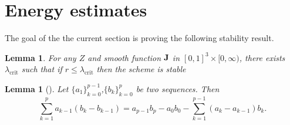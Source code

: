 \documentclass[12pt,reqno]{amsart}
\newcommand{\J}{{\bf J}}
\newtheorem{lem}[theorem]{Lemma}
\newtheorem{lemma}[theorem]{Lemma}
\theoremstyle{definition}
\numberwithin{equation}{section}
\begin{document}
	


	

	\section{Energy estimates}
	The goal of the the current section is proving the following stability result.
	\begin{lemma}\label{lem:coer}
		For any $Z$ and smooth function $\J$ in $[0,1]^3\times [0,\infty)$, there exists 
		$\lambda_{\mathrm{crit}}$ such that if $r\leq \lambda_{\mathrm{crit}}$ then
 the scheme is stable
		\end{lemma}
\begin{lem}[\cite{Morton}]
Let $\{a_1\}_{k=0}^{p-1}$,$\{b_k\}_{k=0}^{p}$ be two sequences. Then
$$
\sum_{k=1}^{p}a_{k-1}(b_k-b_{k-1})=a_{p-1}b_p-a_{0}b_0-\sum_{k=1}^{p-1}(a_{k}-a_{k-1})b_k.
$$
\end{lem}
\end{document}
